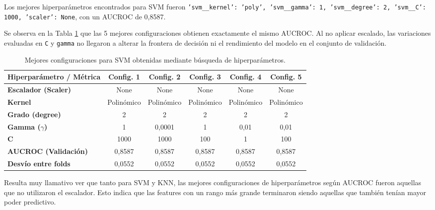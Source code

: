 \documentclass[10pt,a4paper]{article}
\begin{document}
Los mejores hiperparámetros encontrados para SVM fueron \texttt{'svm\_\_kernel': 'poly', 'svm\_\_gamma': 1, 'svm\_\_degree': 2, 'svm\_\_C': 1000, 'scaler': None}, con un AUCROC de 0,8587.

Se observa en la Tabla \ref{tab:svm_gridsearch} que las 5 mejores configuraciones obtienen exactamente el mismo AUCROC. Al no aplicar escalado, las variaciones evaluadas en \texttt{C} y \texttt{gamma} no llegaron a alterar la frontera de decisión ni el rendimiento del modelo en el conjunto de validación.

\begin{table}[H]
\centering
\small %
\setlength{\tabcolsep}{8pt} %
\renewcommand{\arraystretch}{1.2} %

\begin{tabular}{lccccc}
\toprule
\textbf{Hiperparámetro / Métrica} & \textbf{Config. 1} & \textbf{Config. 2} & \textbf{Config. 3} & \textbf{Config. 4} & \textbf{Config. 5} \\
\midrule
\textbf{Escalador (Scaler)} & None       & None       & None       & None       & None \\
\textbf{Kernel}             & Polinómico & Polinómico & Polinómico & Polinómico & Polinómico \\
\textbf{Grado (degree)}     & 2          & 2          & 2          & 2          & 2 \\
\textbf{Gamma ($\gamma$)}   & 1          & 0,0001     & 1          & 0,01       & 0,01 \\
\textbf{C}                  & 1000       & 1000       & 100        & 1          & 100 \\
\midrule
\textbf{AUCROC (Validación)}    & 0,8587 & 0,8587 & 0,8587 & 0,8587 & 0,8587 \\
\textbf{Desvío entre folds}     & 0,0552 & 0,0552 & 0,0552 & 0,0552 & 0,0552 \\
\bottomrule
\end{tabular}

\caption{Mejores configuraciones para SVM obtenidas mediante búsqueda de hiperparámetros.}
\label{tab:svm_gridsearch}
\end{table}

Resulta muy llamativo ver que tanto para SVM y KNN, las mejores configuraciones de hiperparámetros según AUCROC fueron aquellas que no utilizaron el escalador. 
Esto indica que las features con un rango más grande terminaron siendo aquellas que también tenían mayor poder predictivo.
\end{document}
